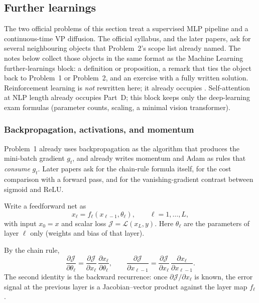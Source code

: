 \subsection{Further learnings}
\label{subsec:dlu}

The two official problems of this section treat a supervised MLP pipeline and a continuous-time VP diffusion. The official syllabus, and the later papers, ask for several neighbouring objects that Problem~2's scope list already named. The notes below collect those objects in the same format as the Machine Learning further-learnings block: a definition or proposition, a remark that ties the object back to Problem~1 or Problem~2, and an exercise with a fully written solution. Reinforcement learning is \emph{not} rewritten here; it already occupies . Self-attention at NLP length already occupies Part~D; this block keeps only the deep-learning exam formulas (parameter counts, scaling, a minimal vision transformer).


\subsubsection{Backpropagation, activations, and momentum}
\label{subsubsec:dlu-backprop}

Problem~1 already uses backpropagation as the algorithm that produces the mini-batch gradient \(g_t\), and already writes momentum and Adam as rules that \emph{consume} \(g_t\). Later papers ask for the chain-rule formula itself, for the cost comparison with a forward pass, and for the vanishing-gradient contrast between sigmoid and ReLU.

\begin{notation}
\label{not:dlu-mlp}
Write a feedforward net as
\[
x_\ell = f_\ell(x_{\ell-1},\theta_\ell),
\qquad
\ell=1,\dots,L,
\]
with input \(x_0=x\) and scalar loss \(\mathcal{J}=\mathcal{L}(x_L,y)\). Here \(\theta_\ell\) are the parameters of layer \(\ell\) only (weights and bias of that layer).
\end{notation}

\begin{proposition}
\label{prop:dlu-layer-grad}
By the chain rule,
\[
\frac{\partial\mathcal{J}}{\partial\theta_\ell}
=
\frac{\partial\mathcal{J}}{\partial x_\ell}\,
\frac{\partial x_\ell}{\partial\theta_\ell},
\qquad
\frac{\partial\mathcal{J}}{\partial x_{\ell-1}}
=
\frac{\partial\mathcal{J}}{\partial x_\ell}\,
\frac{\partial x_\ell}{\partial x_{\ell-1}}.
\]
The second identity is the backward recurrence: once \(\partial\mathcal{J}/\partial x_\ell\) is known, the error signal at the previous layer is a Jacobian--vector product against the layer map \(f_\ell\).
\end{proposition}

